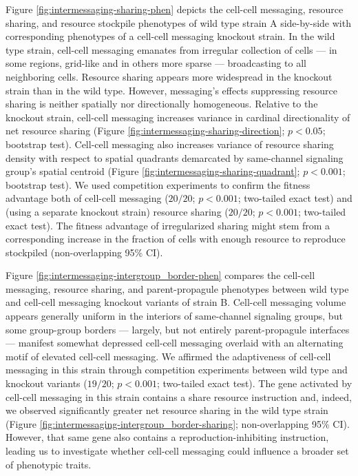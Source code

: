Figure \ref{fig:intermessaging-sharing-phen} depicts the cell-cell messaging, resource sharing, and resource stockpile phenotypes of wild type strain A side-by-side with corresponding phenotypes of a cell-cell messaging knockout strain.
In the wild type strain, cell-cell messaging emanates from irregular collection of cells --- in some regions, grid-like and in others more sparse --- broadcasting to all neighboring cells.
Resource sharing appears more widespread in the knockout strain than in the wild type.
However, messaging's effects suppressing resource sharing is neither spatially nor directionally homogeneous.
Relative to the knockout strain, cell-cell messaging increases variance in cardinal directionality of net resource sharing (Figure \ref{fig:intermessaging-sharing-direction}; $p < 0.05$; bootstrap test).
Cell-cell messaging also increases variance of resource sharing density with respect to spatial quadrants demarcated by same-channel signaling group's spatial centroid (Figure \ref{fig:intermessaging-sharing-quadrant}; $p < 0.001$; bootstrap test).
We used competition experiments to confirm the fitness advantage both of cell-cell messaging ($20/20$; $p < 0.001$; two-tailed exact test) and (using a separate knockout strain) resource sharing ($20/20$; $p < 0.001$; two-tailed exact test).
The fitness advantage of irregularized sharing might stem from a corresponding increase in the fraction of cells with enough resource to reproduce stockpiled (non-overlapping 95\% CI).




Figure \ref{fig:intermessaging-intergroup_border-phen} compares the cell-cell messaging, resource sharing, and parent-propagule phenotypes between wild type and cell-cell messaging knockout variants of strain B.
Cell-cell messaging volume appears generally uniform in the interiors of same-channel signaling groups, but some group-group borders --- largely, but not entirely parent-propagule interfaces --- manifest somewhat depressed cell-cell messaging overlaid with an alternating motif of elevated cell-cell messaging.
We affirmed the adaptiveness of cell-cell messaging in this strain through competition experiments between wild type and knockout variants ($19/20$; $p < 0.001$; two-tailed exact test).
The gene activated by cell-cell messaging in this strain contains a share resource instruction and, indeed, we observed significantly greater net resource sharing in the wild type strain (Figure \ref{fig:intermessaging-intergroup_border-sharing}; non-overlapping 95\% CI).
However, that same gene also contains a reproduction-inhibiting instruction, leading us to investigate whether cell-cell messaging could influence a broader set of phenotypic traits.

